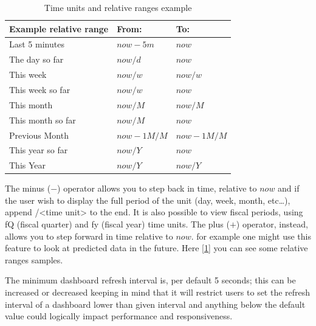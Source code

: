 \begin{table}[!ht]
    \centering
    \begin{tabular}{|l|l|l|}
        \toprule
        Example relative range & From:      & To:        \\ \midrule
        Last 5 minutes         & $now-5m$   & $now$      \\ \hline
        The day so far         & $now/d$    & $now$      \\ \hline
        This week              & $now/w$    & $now/w$    \\ \hline
        This week so far       & $now/w$    & $now$      \\ \hline
        This month             & $now/M$    & $now/M$    \\ \hline
        This month so far      & $now/M$    & $now$      \\ \hline
        Previous Month         & $now-1M/M$ & $now-1M/M$ \\ \hline
        This year so far       & $now/Y$    & $now$      \\ \hline
        This Year              & $now/Y$    & $now/Y$    \\ \bottomrule
    \end{tabular}
    \caption{Time units and relative ranges example}
    \label{table:time_picker}
\end{table}
The minus ($-$) operator allows you to step back in time, relative to $now$ and if the user wish to display the full period of the unit (day, week, month, etc…),
append /<time unit> to the end. It is also possible to view fiscal periods, using fQ (fiscal quarter) and fy (fiscal year) time units.
The plus ($+$) operator, instead, allows you to step forward in time relative to $now$. for example one might use this feature to look at predicted data in the future.
Here [\ref{table:time_picker}] you can see some relative ranges samples.

The minimum dashboard refresh interval is, per default 5 seconds; this can be increased or decreased keeping in mind that
it will restrict users to set the refresh interval of a dashboard lower than given interval and anything below the default value could logically impact performance and responsiveness.

